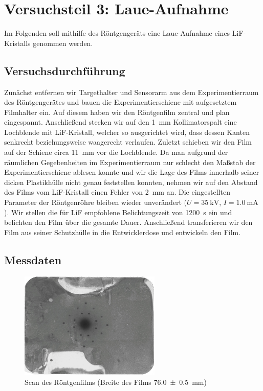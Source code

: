 \documentclass[11pt, a4paper]{article}
\begin{document}
\section{Versuchsteil 3: Laue-Aufnahme}
Im Folgenden soll mithilfe des Röntgengeräts eine Laue-Aufnahme eines LiF-Kristalls genommen werden.

\subsection{Versuchsdurchführung}
Zunächst entfernen wir Targethalter und Sensorarm aus dem Experimentierraum des Röntgengerätes und bauen die Experimentierschiene mit aufgesetztem Filmhalter ein.
Auf diesem haben wir den Röntgenfilm zentral und plan eingespannt.
Anschließend stecken wir auf den \SI{1}{\milli\metre} Kollimatorspalt eine Lochblende mit LiF-Kristall, welcher so ausgerichtet wird, dass dessen Kanten senkrecht beziehungsweise waagerecht verlaufen.
Zuletzt schieben wir den Film auf der Schiene circa \SI{11}{\milli\metre} vor die Lochblende.
Da man aufgrund der räumlichen Gegebenheiten im Experimentierraum nur schlecht den Maßstab der Experimentierschiene ablesen konnte und wir die Lage des Films innerhalb seiner dicken Plastikhülle nicht genau feststellen konnten, nehmen wir auf den Abstand des Films vom LiF-Kristall einen Fehler von \SI{2}{\milli\metre} an.
Die eingestellten Parameter der Röntgenröhre bleiben wieder unverändert ($U = \SI{35}{\kilo\volt}$, $I = \SI{1,0}{\milli\ampere}$).
Wir stellen die für LiF empfohlene Belichtungszeit von \SI{1200}{\second} ein und belichten den Film über die gesamte Dauer.
Anschließend transferieren wir den Film aus seiner Schutzhülle in die Entwicklerdose und entwickeln den Film.

\subsection{Messdaten}
\begin{figure}[h!]
\centering
\includegraphics[width=0.60\textwidth]{./grafiken/film.pdf}
\caption{Scan des Röntgenfilms (Breite des Films \SI{76,0 +- 0,5}{\milli\metre})}
\label{fig:film}
\end{figure}
\end{document}
